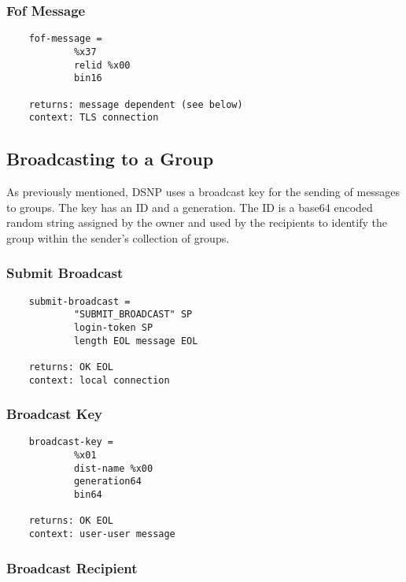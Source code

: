 \documentclass[letterpaper,11pt,oneside]{article}
\begin{document}
\subsubsection{Fof Message}

\vspace{10pt}
\begin{verbatim}
    fof-message =
            %x37 
            relid %x00 
            bin16

    returns: message dependent (see below)
    context: TLS connection
\end{verbatim}


\subsection{Broadcasting to a Group}

As previously mentioned, DSNP uses a broadcast key for the sending of messages
to groups. The key has an ID and a generation. The ID is a base64 encoded
random string assigned by the owner and used by the recipients to identify the
group within the sender's collection of groups.

\subsubsection{Submit Broadcast}

\vspace{10pt}
\begin{verbatim}
    submit-broadcast = 
            "SUBMIT_BROADCAST" SP 
            login-token SP 
            length EOL message EOL

    returns: OK EOL
    context: local connection
\end{verbatim}
\vspace{10pt}


\subsubsection{Broadcast Key}

\vspace{10pt}
\begin{verbatim}
    broadcast-key = 
            %x01 
            dist-name %x00 
            generation64 
            bin64

    returns: OK EOL
    context: user-user message
\end{verbatim}
\vspace{10pt}


\subsubsection{Broadcast Recipient}
\end{document}
